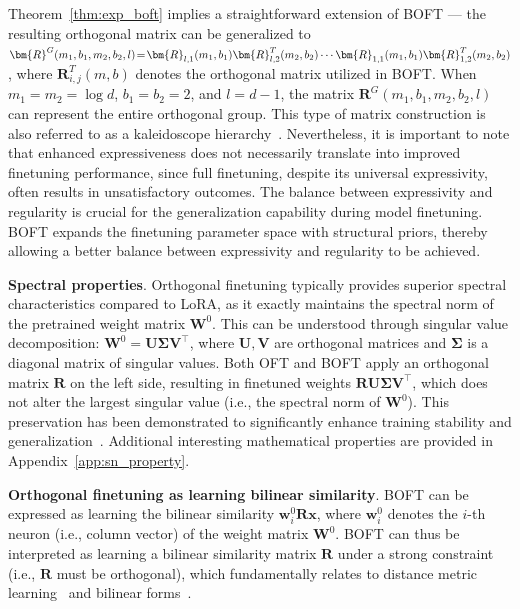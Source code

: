 Theorem~\ref{thm:exp_boft} implies a straightforward extension of BOFT — the resulting orthogonal matrix can be generalized to $\thickmuskip=2mu \medmuskip=2mu \bm{R}^G(m_1,b_1,m_2,b_2,l)=\bm{R}_{l,1}(m_1,b_1)\bm{R}_{l,2}^T(m_2,b_2)\cdots\bm{R}_{1,1}(m_1,b_1)\bm{R}_{1,2}^T(m_2,b_2)$, where $\bm{R}_{i,j}^T(m,b)$ denotes the orthogonal matrix utilized in BOFT. When $m_1 = m_2 = \log d$, $b_1 = b_2 = 2$, and $l = d-1$, the matrix $\bm{R}^G(m_1,b_1,m_2,b_2,l)$ can represent the entire orthogonal group. This type of matrix construction is also referred to as a kaleidoscope hierarchy~\cite{dao2019kaleidoscope}. Nevertheless, it is important to note that enhanced expressiveness does not necessarily translate into improved finetuning performance, since full finetuning, despite its universal expressivity, often results in unsatisfactory outcomes. The balance between expressivity and regularity is crucial for the generalization capability during model finetuning. BOFT expands the finetuning parameter space with structural priors, thereby allowing a better balance between expressivity and regularity to be achieved.

\textbf{Spectral properties}. Orthogonal finetuning typically provides superior spectral characteristics compared to LoRA, as it exactly maintains the spectral norm of the pretrained weight matrix $\bm{W}^0$. This can be understood through singular value decomposition: $\bm{W}^0=\bm{U}\bm{\Sigma}\bm{V}^\top$, where $\bm{U},\bm{V}$ are orthogonal matrices and $\bm{\Sigma}$ is a diagonal matrix of singular values. Both OFT and BOFT apply an orthogonal matrix $\bm{R}$ on the left side, resulting in finetuned weights $\bm{R}\bm{U}\bm{\Sigma}\bm{V}^\top$, which does not alter the largest singular value (i.e., the spectral norm of $\bm{W}^0$). This preservation has been demonstrated to significantly enhance training stability and generalization~\cite{miyato2018spectral,yoshida2017spectral}. Additional interesting mathematical properties are provided in Appendix~\ref{app:sn_property}.

\textbf{Orthogonal finetuning as learning bilinear similarity}. BOFT can be expressed as learning the bilinear similarity $\bm{w}^0_i\bm{R}\bm{x}$, where $\bm{w}^0_i$ denotes the $i$-th neuron (i.e., column vector) of the weight matrix $\bm{W}^0$. BOFT can thus be interpreted as learning a bilinear similarity matrix $\bm{R}$ under a strong constraint (i.e., $\bm{R}$ must be orthogonal), which fundamentally relates to distance metric learning~\cite{xing2002distance} and bilinear forms~\cite{roman2005advanced}.


